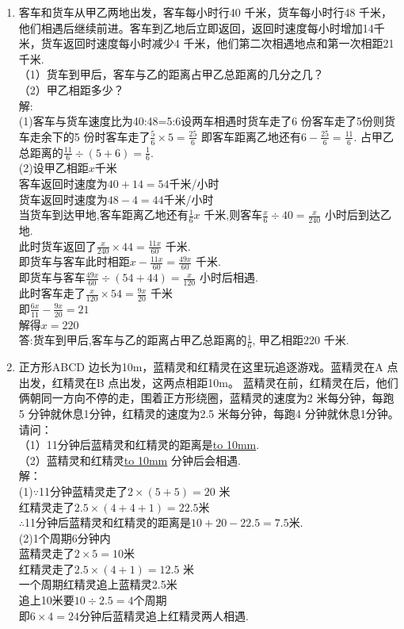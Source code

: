 \documentclass[12pt,oneside,a4paper]{ctexbook} %
\numberwithin{chapter}{part}
\begin{document}
\begin{enumerate}
\item 
客车和货车从甲乙两地出发，客车每小时行40 千米，货车每小时行48 千米，他们相遇后继续前进。客车到乙地后立即返回，返回时速度每小时增加14千米，货车返回时速度每小时减少4 千米，他们第二次相遇地点和第一次相距21 千米.\\
（1）货车到甲后，客车与乙的距离占甲乙总距离的几分之几？\\
（2）甲乙相距多少？\\
解:\\
(1)客车与货车速度比为40:48=5:6设两车相遇时货车走了6 份客车走了5份则货车走余下的5 份时客车走了$\frac{5}{6}\times5=\frac{25}{6}$ 即客车距离乙地还有$6-\frac{25}{6}=\frac{11}{6}$. 占甲乙总距离的$\frac{11}{6}\div(5+6)=\frac{1}{6}$.\\
(2)设甲乙相距$x$千米\\
客车返回时速度为$40+14=54$千米/小时\\
货车返回时速度为$48-4=44$千米/小时\\
当货车到达甲地,客车距离乙地还有$\frac{1}{6}x$ 千米,则客车$\frac{x}{6}\div40=\frac{x}{240}$ 小时后到达乙地.\\
此时货车返回了$\frac{x}{240}\times44=\frac{11x}{60}$ 千米.\\
即货车与客车此时相距$x-\frac{11x}{60}=\frac{49x}{60}$ 千米.\\
即货车与客车$\frac{49x}{60}\div(54+44)=\frac{x}{120}$ 小时后相遇.\\
此时客车走了$\frac{x}{120}\times54=\frac{9x}{20}$ 千米\\
即$\frac{6x}{11}-\frac{9x}{20}=21$\\
解得$x=220$\\
答:货车到甲后,客车与乙的距离占甲乙总距离的$\frac{1}{6}$, 甲乙相距220 千米.

\item 
正方形ABCD 边长为10m，蓝精灵和红精灵在这里玩追逐游戏。蓝精灵在A 点出发，红精灵在B 点出发，这两点相距10m。 蓝精灵在前，红精灵在后，他们俩朝同一方向不停的走，围着正方形绕圈，蓝精灵的速度为2 米每分钟，每跑5 分钟就休息1分钟，红精灵的速度为2.5 米每分钟，每跑4 分钟就休息1分钟。请问：\\
（1）11分钟后蓝精灵和红精灵的距离是\underline{\hbox to 10mm{}}.\\
（2）蓝精灵和红精灵\underline{\hbox to 10mm{}} 分钟后会相遇.\\
解：\\
(1)$\because$11分钟蓝精灵走了$2\times(5+5)=20$ 米\\
红精灵走了$2.5\times(4+4+1)=22.5$米\\
$\therefore$11分钟后蓝精灵和红精灵的距离是$10+20-22.5=7.5$米.\\
(2)1个周期6分钟内\\
蓝精灵走了$2\times5=10$米\\
红精灵走了$2.5\times(4+1)=12.5$ 米\\
一个周期红精灵追上蓝精灵2.5米\\
追上10米要$10\div2.5=4$个周期\\
即$6\times4=24$分钟后蓝精灵追上红精灵两人相遇.


\end{enumerate}
\end{document}
